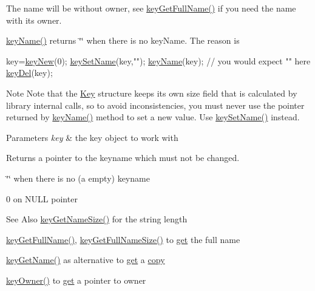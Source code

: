 The name will be without owner, see \hyperlink{group__keyname_gaaba1494a5ffc976e0e56c43f4334a23c}{key\-Get\-Full\-Name()} if you need the name with its owner.

\hyperlink{group__keyname_ga8e805c726a60da921d3736cda7813513}{key\-Name()} returns \char`\"{}\char`\"{} when there is no key\-Name. The reason is 
\begin{DoxyCode}
key=\hyperlink{group__key_gad23c65b44bf48d773759e1f9a4d43b89}{keyNew}(0);
\hyperlink{group__keyname_ga7699091610e7f3f43d2949514a4b35d9}{keySetName}(key,\textcolor{stringliteral}{""});
\hyperlink{group__keyname_ga8e805c726a60da921d3736cda7813513}{keyName}(key); \textcolor{comment}{// you would expect "" here}
\hyperlink{group__key_ga3df95bbc2494e3e6703ece5639be5bb1}{keyDel}(key);
\end{DoxyCode}


\begin{DoxyNote}{Note}
Note that the \hyperlink{classkdb_1_1Key}{Key} structure keeps its own size field that is calculated by library internal calls, so to avoid inconsistencies, you must never use the pointer returned by \hyperlink{group__keyname_ga8e805c726a60da921d3736cda7813513}{key\-Name()} method to set a new value. Use \hyperlink{group__keyname_ga7699091610e7f3f43d2949514a4b35d9}{key\-Set\-Name()} instead.
\end{DoxyNote}

\begin{DoxyParams}{Parameters}
{\em key} & the key object to work with \\
\hline
\end{DoxyParams}
\begin{DoxyReturn}{Returns}
a pointer to the keyname which must not be changed. 

\char`\"{}\char`\"{} when there is no (a empty) keyname 

0 on N\-U\-L\-L pointer 
\end{DoxyReturn}
\begin{DoxySeeAlso}{See Also}
\hyperlink{group__keyname_gabdbcfa51ed8a387e47ead207affa2d2e}{key\-Get\-Name\-Size()} for the string length 

\hyperlink{group__keyname_gaaba1494a5ffc976e0e56c43f4334a23c}{key\-Get\-Full\-Name()}, \hyperlink{group__keyname_gab65dc9d43d3ee08d5e936a20ebbddd23}{key\-Get\-Full\-Name\-Size()} to \hyperlink{classkdb_1_1Key_ae8f4cf386b825c8efc29ce0db977f0d2}{get} the full name 

\hyperlink{group__keyname_gab29a850168d9b31c9529e90cf9ab68be}{key\-Get\-Name()} as alternative to \hyperlink{classkdb_1_1Key_ae8f4cf386b825c8efc29ce0db977f0d2}{get} a \hyperlink{classkdb_1_1Key_ab5bc93e22f4cf40b9d2b1fc32cc260be}{copy} 

\hyperlink{group__keyname_gaf6485fb8599714b6bbd830cf915ffea5}{key\-Owner()} to \hyperlink{classkdb_1_1Key_ae8f4cf386b825c8efc29ce0db977f0d2}{get} a pointer to owner 
\end{DoxySeeAlso}


